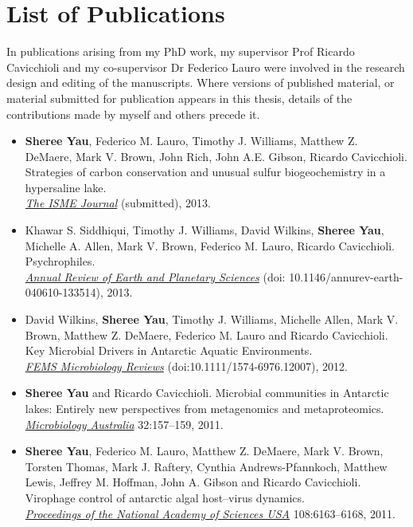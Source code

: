 \chapter*{List of Publications}
In publications arising from my PhD work, my supervisor Prof Ricardo Cavicchioli and my co-supervisor Dr Federico Lauro were
involved in the research design and editing of the manuscripts.
Where versions of published material, or material submitted for publication appears in this thesis, details of the contributions made by myself and others precede it.

\begin{itemize}

\item \textbf{Sheree Yau}, Federico M. Lauro, Timothy J. Williams, Matthew Z. DeMaere, Mark V. Brown, John Rich, John A.E. Gibson, Ricardo Cavicchioli. 
Strategies of carbon conservation and unusual sulfur biogeochemistry in a hypersaline lake. \\
\emph{\underline{The ISME Journal}}
(submitted), 2013.

\item Khawar S. Siddhiqui, Timothy J. Williams, David Wilkins, \textbf{Sheree Yau}, Michelle A. Allen, Mark V. Brown, Federico M. Lauro, Ricardo Cavicchioli.
Psychrophiles.\\
\emph{\underline{Annual Review of Earth and Planetary Sciences}}
(doi: 10.1146/annurev-earth-040610-133514), 2013.

\item David Wilkins, \textbf{Sheree Yau}, Timothy J. Williams, Michelle Allen, Mark V. Brown, Matthew Z. DeMaere, Federico M. Lauro and Ricardo Cavicchioli.
Key Microbial Drivers in Antarctic Aquatic Environments.\\
\emph{\underline{FEMS Microbiology Reviews}} 
(doi:10.1111/1574-6976.12007), 2012.

\item \textbf{Sheree Yau} and Ricardo Cavicchioli. 
Microbial communities in Antarctic lakes: Entirely new perspectives from metagenomics and metaproteomics. \\
\emph{\underline{Microbiology Australia}} 32:157--159, 2011.

\item \textbf{Sheree Yau}, Federico M. Lauro, Matthew Z. DeMaere, Mark V. Brown, Torsten Thomas, 
Mark J. Raftery, Cynthia Andrews-Pfannkoch, Matthew Lewis, Jeffrey M. Hoffman, John A. Gibson and 
Ricardo Cavicchioli. 
Virophage control of antarctic algal host--virus dynamics. \\
\emph{\underline{Proceedings of the National Academy of Sciences USA}}
108:6163--6168, 2011.


\end{itemize}
